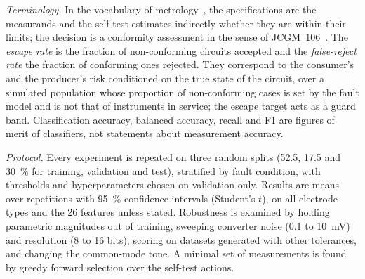 \emph{Terminology.} In the vocabulary of metrology~\cite{vim,gum}, the specifications are the
measurands and the self-test estimates indirectly whether they are within their limits; the
decision is a conformity assessment in the sense of JCGM~106~\cite{jcgm106}. The \emph{escape
rate} is the fraction of non-conforming circuits accepted and the \emph{false-reject rate} the
fraction of conforming ones rejected. They correspond to the consumer's and the producer's risk
conditioned on the true state of the circuit, over a simulated population whose proportion of
non-conforming cases is set by the fault model and is not that of instruments in service; the
escape target acts as a guard band. Classification accuracy, balanced accuracy, recall and F1 are
figures of merit of classifiers, not statements about measurement accuracy.

\emph{Protocol.} Every experiment is repeated on three random splits (52.5, 17.5 and
\SI{30}{\percent} for training, validation and test), stratified by fault condition, with
thresholds and hyperparameters chosen on validation only. Results are means over repetitions with
\SI{95}{\percent} confidence intervals (Student's $t$), on all electrode types and the 26
features unless stated. Robustness is examined by holding parametric magnitudes out of training,
sweeping converter noise (0.1 to \SI{10}{\milli\volt}) and resolution (8 to 16 bits), scoring on
datasets generated with other tolerances, and changing the common-mode tone. A minimal set of
measurements is found by greedy forward selection over the self-test actions.
